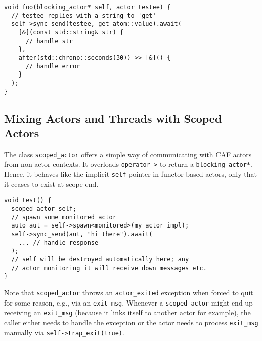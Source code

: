 \begin{lstlisting}
void foo(blocking_actor* self, actor testee) {
  // testee replies with a string to 'get'
  self->sync_send(testee, get_atom::value).await(
    [&](const std::string& str) {
      // handle str
    },
    after(std::chrono::seconds(30)) >> [&]() {
      // handle error
    }
  );
}
\end{lstlisting}

\subsection{Mixing Actors and Threads with Scoped Actors}

The class \lstinline^scoped_actor^ offers a simple way of communicating with CAF actors from non-actor contexts.
It overloads \lstinline^operator->^ to return a \lstinline^blocking_actor*^.
Hence, it behaves like the implicit \lstinline^self^ pointer in functor-based actors, only that it ceases to exist at scope end.

\begin{lstlisting}
void test() {
  scoped_actor self;
  // spawn some monitored actor
  auto aut = self->spawn<monitored>(my_actor_impl);
  self->sync_send(aut, "hi there").await(
    ... // handle response
  );
  // self will be destroyed automatically here; any
  // actor monitoring it will receive down messages etc.
}
\end{lstlisting}

Note that \lstinline^scoped_actor^ throws an \lstinline^actor_exited^ exception when forced to quit for some reason, e.g., via an \lstinline^exit_msg^.
Whenever a \lstinline^scoped_actor^ might end up receiving an \lstinline^exit_msg^ (because it links itself to another actor for example), the caller either needs to handle the exception or the actor needs to process \lstinline^exit_msg^ manually via \lstinline^self->trap_exit(true)^.
